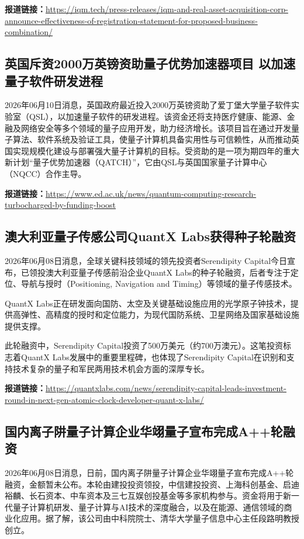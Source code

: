 \documentclass[12pt,a4paper]{ctexart}
\begin{document}
\noindent\textbf{报道链接：}\url{https://iqm.tech/press-releases/iqm-and-real-asset-acquisition-corp-announce-effectiveness-of-registration-statement-for-proposed-business-combination/}

\subsection{ 英国斥资2000万英镑资助量子优势加速器项目 以加速量子软件研发进程 }

2026年06月10日消息，英国政府最近投入2000万英镑资助了爱丁堡大学量子软件实验室（QSL），以加速量子软件的研发进程。该资金还将支持医疗健康、能源、金融及网络安全等多个领域的量子应用开发，助力经济增长。该项目旨在通过开发量子算法、软件系统及验证工具，使量子计算机具备实用性与可信赖性，从而推动英国实现规模化建设与部署强大量子计算机的目标。受资助的是一项为期四年的重大新计划“量子优势加速器（QATCH）”，它由QSL与英国国家量子计算中心（NQCC）合作主导。

\noindent\textbf{报道链接：}\url{https://www.ed.ac.uk/news/quantum-computing-research-turbocharged-by-funding-boost}

\subsection{ 澳大利亚量子传感公司QuantX Labs获得种子轮融资 }

2026年06月08日消息，全球关键科技领域的领先投资者Serendipity Capital今日宣布，已领投澳大利亚量子传感前沿企业QuantX Labs的种子轮融资，后者专注于定位、导航与授时（Positioning, Navigation and Timing）等领域的量子传感技术。

QuantX Labs正在研发面向国防、太空及关键基础设施应用的光学原子钟技术，提供高弹性、高精度的授时和定位能力，为现代国防系统、卫星网络及国家基础设施提供支撑。

此轮融资中，Serendipity Capital投资了500万美元（约700万澳元）。这笔投资标志着QuantX Labs发展中的重要里程碑，也体现了Serendipity Capital在识别和支持技术复杂的量子和军民两用技术机会方面的深厚专长。

\noindent\textbf{报道链接：}\url{https://quantxlabs.com/news/serendipity-capital-leads-investment-round-in-next-gen-atomic-clock-developer-quant-x-labs/}

\subsection{ 国内离子阱量子计算企业华翊量子宣布完成A++轮融资 }

2026年06月08日消息，日前，国内离子阱量子计算企业华翊量子宣布完成A++轮融资，金额暂未公布。本轮由建投投资领投，中信建投投资、上海科创基金、启迪裕麟、长石资本、中车资本及三七互娱创投基金等多家机构参与。资金将用于新一代量子计算机研发、量子计算与AI技术的深度融合，以及在能源、通信领域的商业化应用。据了解，该公司由中科院院士、清华大学量子信息中心主任段路明教授创立。
\end{document}
